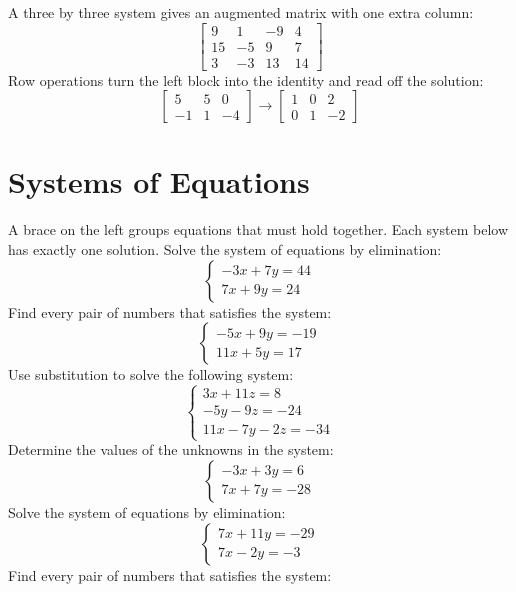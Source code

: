 \documentclass[11pt]{article}
\begin{document}
A three by three system gives an augmented matrix with one extra column:
\label{eq026}\[
  \left[ \begin{array}{ccc|c} 9 & 1 & -9 & 4 \\ 15 & -5 & 9 & 7 \\ 3 & -3 & 13 & 14 \end{array} \right]
\]
Row operations turn the left block into the identity and read off the solution:
\label{eq027}\[
  \left[ \begin{array}{cc|c} 5 & 5 & 0 \\ -1 & 1 & -4 \end{array} \right] \longrightarrow \left[ \begin{array}{cc|c} 1 & 0 & 2 \\ 0 & 1 & -2 \end{array} \right]
\]
\section*{Systems of Equations}
A brace on the left groups equations that must hold together. Each system below has exactly one solution.
Solve the system of equations by elimination:
\label{eq028}\[
  \left\{ \begin{array}{l} -3x + 7y = 44 \\ 7x + 9y = 24 \end{array} \right.
\]
Find every pair of numbers that satisfies the system:
\label{eq029}\[
  \left\{ \begin{array}{l} -5x + 9y = -19 \\ 11x + 5y = 17 \end{array} \right.
\]
Use substitution to solve the following system:
\label{eq030}\[
  \left\{ \begin{array}{l} 3x + 11z = 8 \\ -5y - 9z = -24 \\ 11x - 7y - 2z = -34 \end{array} \right.
\]
Determine the values of the unknowns in the system:
\label{eq031}\[
  \left\{ \begin{array}{l} -3x + 3y = 6 \\ 7x + 7y = -28 \end{array} \right.
\]
Solve the system of equations by elimination:
\label{eq032}\[
  \left\{ \begin{array}{l} 7x + 11y = -29 \\ 7x - 2y = -3 \end{array} \right.
\]
Find every pair of numbers that satisfies the system:
\end{document}
